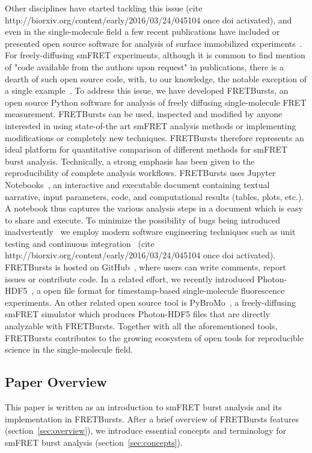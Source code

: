 Other disciplines have started tackling this issue 
(cite http://biorxiv.org/content/early/2016/03/24/045104 once doi activated),
and even in the single-molecule field a few recent publications have included or presented 
open source software  
for analysis of surface immobilized experiments~\cite{Bronson_2009,Greenfeld_2012, K_nig_2013}.
For freely-diffusing smFRET experiments, although it is common to find mention of 
"code available from the authors upon request" in publications, there is a dearth 
of such open source code, with, to our knowledge, the notable exception of a single 
example~\cite{Murphy2014}.
To address this issue, we have developed FRETBursts,
an open source Python software for analysis of freely diffusing single-molecule FRET measurement.
FRETBursts can be used, inspected and modified by anyone interested in using 
state-of-the art smFRET analysis methods or implementing modifications or completely new techniques. 
FRETBursts therefore represents an ideal platform
for quantitative comparison of different methods for smFRET burst analysis.
Technically, a strong emphasis has been given to the reproducibility of complete analysis
workflows. FRETBursts uses Jupyter Notebooks~\cite{Shen_2014},
an interactive and executable document containing textual narrative, input parameters, 
code, and computational results (tables, plots, etc.). A notebook thus captures the various analysis steps
in a document which is easy to share and execute.
To minimize the possibility of bugs being introduced inadvertently~\cite{Soergel_2015} 
we employ modern software engineering techniques
such as unit testing and continuous integration~\cite{Wilson_2014}
(cite http://biorxiv.org/content/early/2016/03/24/045104 once doi activated).
FRETBursts is hosted on GitHub~\cite{Blischak_2016,Prli__2012},
where users can write comments, report issues or contribute code.
In a related effort, we recently introduced Photon-HDF5~\cite{Ingargiola2016},
a open file format for timestamp-based single-molecule fluorescence
experiments. An other related open source tool is PyBroMo~\cite{Ingargiola_2016},
a freely-diffusing smFRET simulator which produces Photon-HDF5 files that are
directly analyzable with FRETBursts.
Together with all the aforementioned tools, FRETBursts contributes to the growing 
ecosystem of open tools for reproducible science in the single-molecule field.

\subsection{Paper Overview}
This paper is written as an introduction to smFRET burst analysis and its implementation in FRETBursts.
After a brief overview of FRETBursts features (section~\ref{sec:overview}),
we introduce essential concepts and terminology for smFRET burst analysis 
(section~\ref{sec:concepts}).


